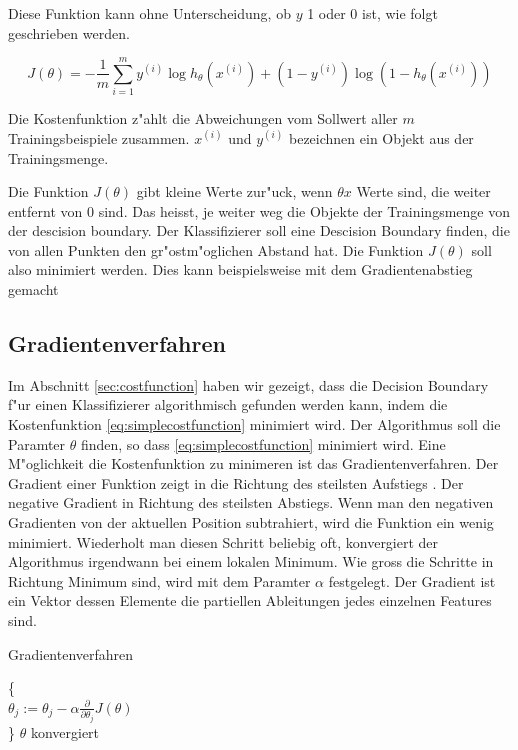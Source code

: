 \documentclass[12pt,a4paper,twoside]{article}
\begin{document}
Diese Funktion kann ohne Unterscheidung, ob $y$ 1 oder 0 ist, wie folgt geschrieben werden. 

\begin{equation}
  \label{eq;simplecostfunction}
  J( \theta ) = - \frac{1}{m} \sum_{i=1}^m y^{(i)} \log h_{\theta}(x^{(i)}) + (1 - y^{(i)}) \log(1 - h_{\theta}(x^{(i)}))
\end{equation}

Die Kostenfunktion z"ahlt die Abweichungen vom Sollwert aller $m$ Trainingsbeispiele zusammen. $x^{(i)}$ und $y^{(i)}$ bezeichnen ein Objekt aus der Trainingsmenge.

Die Funktion $J(\theta)$ gibt kleine Werte zur"uck, wenn $\theta x$ Werte sind, die weiter entfernt von 0 sind. Das heisst, je weiter weg die Objekte der Trainingsmenge von der descision boundary. Der Klassifizierer soll eine Descision Boundary finden, die von allen Punkten den gr"ostm"oglichen Abstand hat. Die Funktion $J(\theta)$ soll also minimiert werden. Dies kann beispielsweise mit dem Gradientenabstieg gemacht 

\subsection{Gradientenverfahren}
\label{sec:gradientdescent}

Im Abschnitt \ref{sec:costfunction} haben wir gezeigt, dass die Decision Boundary f"ur einen Klassifizierer algorithmisch gefunden werden kann, indem die Kostenfunktion \ref{eq:simplecostfunction} minimiert wird. Der Algorithmus soll die Paramter $\theta$ finden, so dass \ref{eq:simplecostfunction} minimiert wird. Eine M"oglichkeit die Kostenfunktion zu minimeren ist das Gradientenverfahren. Der Gradient einer Funktion zeigt in die Richtung des steilsten Aufstiegs \cite{teschl07}. Der negative Gradient in Richtung des steilsten Abstiegs. Wenn man den negativen Gradienten von der aktuellen Position subtrahiert, wird die Funktion ein wenig minimiert. Wiederholt man diesen Schritt beliebig oft, konvergiert der Algorithmus irgendwann bei einem lokalen Minimum. Wie gross die Schritte in Richtung Minimum sind, wird mit dem Paramter $\alpha$ festgelegt. Der Gradient ist ein Vektor dessen Elemente die partiellen Ableitungen jedes einzelnen Features sind.

\begin{algorithm}
\caption{Gradientenverfahren}
\begin{algorithmic}

\Repeat \{ \\
$\theta_j := \theta_j - \alpha \frac{\partial}{\partial \theta_j} J(\theta)$  \\
\}
\Until $\theta$ konvergiert 

 \end{algorithmic}  
\end{algorithm}
\end{document}
